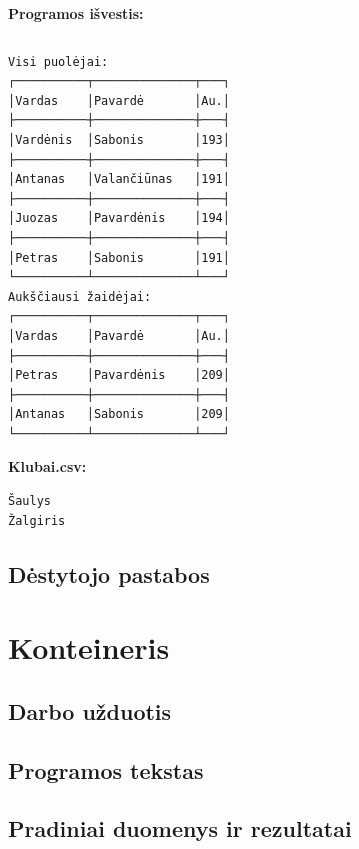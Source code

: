 \documentclass{article}
\begin{document}
\begin{changemargin}{0cm}{0cm}
    \textbf{Programos išvestis:}
\end{changemargin}


\inputminted[fontsize=\footnotesize]{csharp}{Assets/L2/test2-output.txt}

\footnotesize
\begin{verbatim}
Visi puolėjai:
┌──────────┬──────────────┬───┐
│Vardas    │Pavardė       │Au.│
├──────────┼──────────────┼───┤
│Vardėnis  │Sabonis       │193│
├──────────┼──────────────┼───┤
│Antanas   │Valančiūnas   │191│
├──────────┼──────────────┼───┤
│Juozas    │Pavardėnis    │194│
├──────────┼──────────────┼───┤
│Petras    │Sabonis       │191│
└──────────┴──────────────┴───┘
Aukščiausi žaidėjai:
┌──────────┬──────────────┬───┐
│Vardas    │Pavardė       │Au.│
├──────────┼──────────────┼───┤
│Petras    │Pavardėnis    │209│
├──────────┼──────────────┼───┤
│Antanas   │Sabonis       │209│
└──────────┴──────────────┴───┘
\end{verbatim}
\normalsize

\begin{changemargin}{0cm}{0cm}
    \textbf{Klubai.csv:}
\end{changemargin}

\footnotesize
\begin{verbatim}
Šaulys
Žalgiris
\end{verbatim}
\normalsize

\subsection{Dėstytojo pastabos}
\newpage


\section{Konteineris}
\subsection{Darbo užduotis}
\subsection{Programos tekstas}
\subsection{Pradiniai duomenys ir rezultatai}
\end{document}
